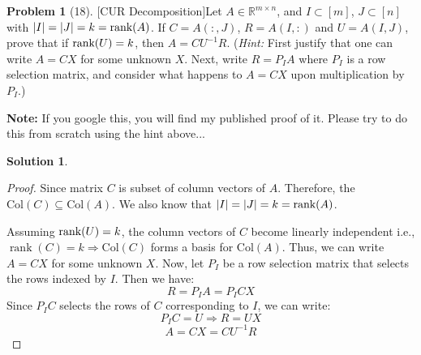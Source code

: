 \documentclass{amsart}[11pt]
\theoremstyle{definition}
\newtheorem*{problem}{Problem}
\newtheorem*{solution}{Solution}
\newcommand{\R}{\mathbb{R}}
\newcommand{\rank}{\textnormal{rank}}
\begin{document}
\begin{problem}[18][CUR Decomposition]\label{PROB:CUREasy}
Let $A\in\R^{m\times n}$, and $I\subset[m]$, $J\subset[n]$ with $|I|=|J|=k=\textnormal{rank}(A)$.  If $C=A(:,J)$, $R=A(I,:)$ and $U=A(I,J)$, prove that if $\rank(U)=k$, then $A=CU^{-1}R$.  (\textit{Hint:} First justify that one can write $A=CX$ for some unknown $X$. Next, write $R=P_IA$ where $P_I$ is a row selection matrix, and consider what happens to $A=CX$ upon multiplication by $P_I$.)

\textbf{Note:} If you google this, you will find my published proof of it. Please try to do this from scratch using the hint above... 
\begin{solution}
\begin{proof}
        Since matrix $C$ is subset of column vectors of $A$. Therefore, the $\text{Col}(C) \subseteq \text{Col}(A)$. We also know that $|I|=|J|=k=\textnormal{rank}(A)$.

    Assuming $\rank(U)=k$, the column vectors of $C$ become linearly independent i.e., $\operatorname{rank}(C)=k \Rightarrow \text{Col}(C)$ forms a basis for $\text{Col}(A)$. Thus, we can write $A=CX$ for some unknown $X$. Now, let $P_I$ be a row selection matrix that selects the rows indexed by $I$. Then we have:
    \[
    R = P_I A = P_I C X
    \]
    Since $P_I C$ selects the rows of $C$ corresponding to $I$, we can write:
    \[
    P_I C = U
    \Rightarrow R = U X
    \]
    \[
    A = C X = C U^{-1} R
    \]

\end{proof}
\end{solution}
\end{problem}
\end{document}
